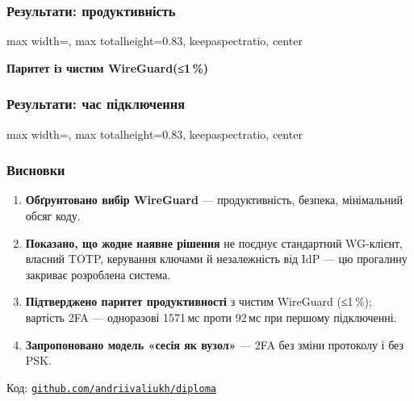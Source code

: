 \documentclass[aspectratio=43,14pt]{beamer}
\newcommand{\fitfig}[1]{%
  \begin{adjustbox}{max width=\textwidth, max totalheight=0.83\textheight,
                    keepaspectratio, center}%
  \end{adjustbox}%
}
\begin{document}
\begin{frame}[c]
  \frametitle{Результати: продуктивність}
  \fitfig{fig-results-perf}
  \par\vspace{0.4em}
  \begin{center}
    {\small\bfseries\color{clAccent} Паритет із чистим WireGuard\;(≤1\,\%)}
  \end{center}
\end{frame}

\begin{frame}[c]
  \frametitle{Результати: час підключення}
  \fitfig{fig-results-onboarding}
\end{frame}


\begin{frame}[shrink=15]
  \frametitle{Висновки}
  \vspace*{0.10em}
  {\small
  \begin{enumerate}
    \setlength{\itemsep}{0.15em}
    \item \textbf{Обґрунтовано вибір WireGuard} --- продуктивність,
          безпека, мінімальний обсяг коду.
    \item \textbf{Показано, що жодне наявне рішення} не поєднує
          стандартний WG-клієнт, власний TOTP, керування ключами й
          незалежність від IdP --- цю прогалину закриває розроблена
          система.
    \item \textbf{Підтверджено паритет продуктивності} з чистим
          WireGuard (≤1\,\%); вартість 2FA --- одноразові 1571\,мс
          проти 92\,мс при першому підключенні.
    \item \textbf{Запропоновано модель «сесія як вузол»} --- 2FA без
          зміни протоколу і без PSK.
  \end{enumerate}
  }%
  \vspace{0.25em}
  \begin{center}
    {\small\color{clGrey} Код:\enspace
      \href{https://github.com/andriivaliukh/diploma}{%
        \textcolor{clAccent}{\texttt{github.com/andriivaliukh/diploma}}}}
  \end{center}
\end{frame}
\end{document}
